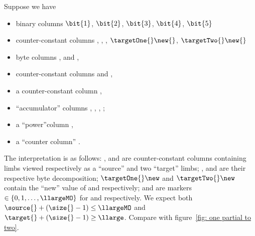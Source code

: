 Suppose we have
\begin{itemize}
	\item binary columns $\bit{1}$, $\bit{2}$, $\bit{3}$, $\bit{4}$, $\bit{5}$
	\item counter-constant columns \source{}, \targetOne{}, \targetTwo{}, $\targetOne{}\new{}$, $\targetTwo{}\new{}$
	\item byte columns \source{}\byte{}, \targetOne{}\byte{} and \targetTwo{}\byte{},
	\item counter-constant columns \source{}\mark{} and \targetOne{}\mark{},
	\item a counter-constant column \size{},
	\item ``accumulator'' columns , , , ;
	\item a ``power''column ,
	\item a ``counter column'' \ct{}.
\end{itemize}
The interpretation is as follows: 
\source{}, \targetOne{} and \targetTwo{} are counter-constant columns containing limbs viewed respectively as a ``source'' and two ``target'' limbs; 
\source{}\byte{}, \targetOne{}\byte{} and \targetTwo{}\byte{} are their respective byte decomposition;
$\targetOne{}\new$ and $\targetTwo{}\new$ contain the ``new'' value of \targetOne{} and \targetTwo{} respectively; 
\source{}\mark{} and \target{}\mark{} are markers $\in\{0,1,\dots,\llargeMO\}$ for \source{} and \targetOne{} respectively.
We expect both
$\source{}\mark{} + (\size{}-1)\leq \llargeMO$ and
$\target{}\mark{} + (\size{}-1)\geq \llarge$.
Compare with figure~\ref{fig: one partial to two}.

